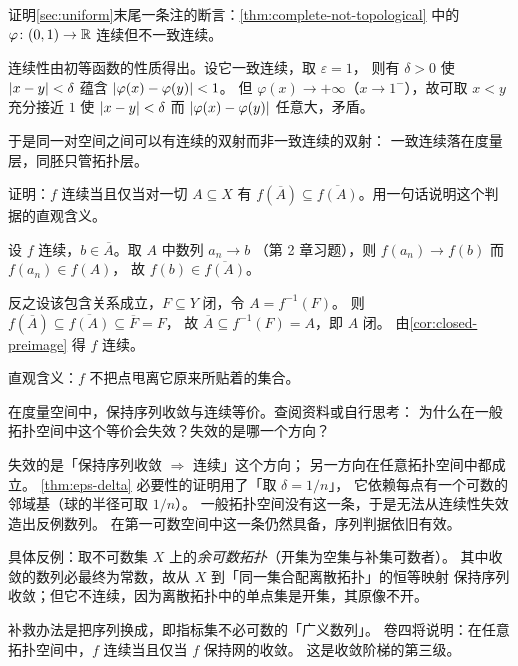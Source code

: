 \begin{exercise}[结构]
  \label{exr:uniform-not-topological}
  证明\cref{sec:uniform}末尾一条注的断言：\cref{thm:complete-not-topological} 中的
  \(\varphi \colon (0,1) \to \mathbb{R}\) 连续但不一致连续。
  \begin{solution}
    连续性由初等函数的性质得出。设它一致连续，取 \(\varepsilon=1\)，
    则有 \(\delta>0\) 使 \(\lvert x-y\rvert<\delta\) 蕴含 \(\lvert\varphi(x)-\varphi(y)\rvert<1\)。
    但 \(\varphi(x) \to +\infty\)（\(x \to 1^{-}\)），故可取 \(x<y\) 充分接近 \(1\)
    使 \(\lvert x-y\rvert<\delta\) 而 \(\lvert\varphi(x)-\varphi(y)\rvert\) 任意大，矛盾。

    于是同一对空间之间可以有连续的双射而非一致连续的双射：
    一致连续落在度量层，同胚只管拓扑层。
  \end{solution}
\end{exercise}

\begin{exercise}[结构]
  \label{exr:closure-criterion}
  证明：\(f\) 连续当且仅当对一切 \(A \subseteq X\) 有
  \(f(\overline{A}) \subseteq \overline{f(A)}\)。用一句话说明这个判据的直观含义。
  \begin{solution}
    设 \(f\) 连续，\(b \in \overline{A}\)。取 \(A\) 中数列 \(a_{n} \to b\)
    （第 2 章习题），则 \(f(a_{n}) \to f(b)\) 而 \(f(a_{n}) \in f(A)\)，
    故 \(f(b) \in \overline{f(A)}\)。

    反之设该包含关系成立，\(F \subseteq Y\) 闭，令 \(A=f^{-1}(F)\)。
    则 \(f(\overline{A}) \subseteq \overline{f(A)} \subseteq \overline{F}=F\)，
    故 \(\overline{A} \subseteq f^{-1}(F)=A\)，即 \(A\) 闭。
    由\cref{cor:closed-preimage} 得 \(f\) 连续。

    直观含义：\(f\) 不把点甩离它原来所贴着的集合。
  \end{solution}
\end{exercise}

\begin{exercise}[延伸]
  \label{exr:seq-not-enough}
  在度量空间中，保持序列收敛与连续等价。查阅资料或自行思考：
  为什么在一般拓扑空间中这个等价会失效？失效的是哪一个方向？
  \begin{solution}
    失效的是「保持序列收敛 \(\Rightarrow\) 连续」这个方向；
    另一方向在任意拓扑空间中都成立。
    \cref{thm:eps-delta} 必要性的证明用了「取 \(\delta=1/n\)」，
    它依赖每点有一个可数的邻域基（球的半径可取 \(1/n\)）。
    一般拓扑空间没有这一条，于是无法从连续性失效造出反例数列。
    在第一可数空间中这一条仍然具备，序列判据依旧有效。

    具体反例：取不可数集 \(X\) 上的\emph{余可数拓扑}（开集为空集与补集可数者）。
    其中收敛的数列必最终为常数，故从 \(X\) 到「同一集合配离散拓扑」的恒等映射
    保持序列收敛；但它不连续，因为离散拓扑中的单点集是开集，其原像不开。

    补救办法是把序列换成，即指标集不必可数的「广义数列」。
    卷四将说明：在任意拓扑空间中，\(f\) 连续当且仅当 \(f\) 保持网的收敛。
    这是收敛阶梯的第三级。
  \end{solution}
\end{exercise}

